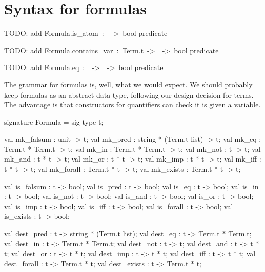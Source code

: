 
\section{Syntax for formulas}

TODO: add {\Tt{}Formula.is{\_}atom\ :\ \ ->\ bool\nwendquote} predicate

TODO: add {\Tt{}Formula.contains{\_}var\ :\ Term.t\ ->\ \ ->\ bool\nwendquote}
predicate

TODO: add {\Tt{}Formula.eq\ :\ \ ->\ \ ->\ bool\nwendquote} predicate

\begin{node}
The grammar for formulas is, well, what we would expect. We should
probably keep formulas as an abstract data type, following our design
decision for terms. The advantage is that constructors for quantifiers
can check it is given a variable.
\end{node}

\nwenddocs{}\endmoddef\nwstartdeflinemarkup\nwenddeflinemarkup
signature Formula = sig
  type t;

  val mk_falsum : unit -> t;
  val mk_pred : string * (Term.t list) -> t;
  val mk_eq : Term.t * Term.t -> t;
  val mk_in : Term.t * Term.t -> t;
  val mk_not : t -> t;
  val mk_and : t * t -> t;
  val mk_or  : t * t -> t;
  val mk_imp : t * t -> t;
  val mk_iff : t * t -> t;
  val mk_forall : Term.t * t -> t;
  val mk_exists : Term.t * t -> t;

  val is_falsum : t -> bool;
  val is_pred : t -> bool;
  val is_eq : t -> bool;
  val is_in : t -> bool;
  val is_not : t -> bool;
  val is_and : t -> bool;
  val is_or : t -> bool;
  val is_imp : t -> bool;
  val is_iff : t -> bool;
  val is_forall : t -> bool;
  val is_exists : t -> bool;

  val dest_pred : t -> string * (Term.t list);
  val dest_eq : t -> Term.t * Term.t;
  val dest_in : t -> Term.t * Term.t;
  val dest_not : t -> t;
  val dest_and : t -> t * t;
  val dest_or  : t -> t * t;
  val dest_imp : t -> t * t;
  val dest_iff : t -> t * t;
  val dest_forall : t -> Term.t * t;
  val dest_exists : t -> Term.t * t;

